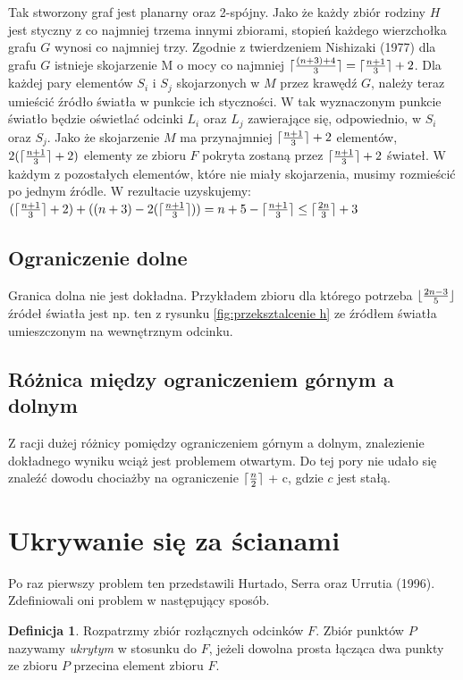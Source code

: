 \documentclass[brudnopis]{xmgr}
\DeclarePairedDelimiter\ceil{\lceil}{\rceil}
\DeclarePairedDelimiter\floor{\lfloor}{\rfloor}
\theoremstyle{definition}
\newtheorem{Definicja}{Definicja}
\begin{document}
Tak stworzony graf jest planarny oraz 2-spójny. Jako że każdy zbiór rodziny $H$ jest styczny z co najmniej trzema innymi zbiorami, stopień każdego wierzchołka grafu $G$ wynosi co najmniej trzy. Zgodnie z twierdzeniem Nishizaki (1977) dla grafu $G$ istnieje skojarzenie M o mocy co najmniej $\ceil{\frac{(n+3)+4}{3}} = \ceil{\frac{n+1}{3}}  + 2$. Dla każdej pary elementów $S_i$ i $S_j$ skojarzonych w $M$ przez krawędź $G$, należy teraz umieścić źródło światła w punkcie ich styczności. W tak wyznaczonym punkcie światło będzie oświetlać odcinki $L_i$ oraz $L_j$ zawierające się, odpowiednio, w $S_i$ oraz $S_j$. Jako że skojarzenie $M$ ma przynajmniej $\ceil{\frac{n+1}{3}} + 2$ elementów, $2(\ceil{\frac{n+1}{3}} + 2)$ elementy ze zbioru $F$ pokryta zostaną przez $\ceil{\frac{n+1}{3}} + 2$ świateł. W każdym z pozostałych elementów, które nie miały skojarzenia, musimy rozmieścić po jednym źródle. W rezultacie uzyskujemy:
$(\ceil{\frac{n+1}{3}} + 2) + ((n + 3) - 2(\ceil{\frac{n+1}{3}})) = n + 5 - \ceil{\frac{n+1}{3}} \le \ceil{\frac{2n}{3}} + 3$

\subsection{Ograniczenie dolne}
\indent Granica dolna nie jest dokładna. Przykładem zbioru dla którego potrzeba $\floor{\frac{2n-3}{5}}$ źródeł światła jest np. ten z rysunku \ref{fig:przeksztalcenie h} ze źródłem światła umieszczonym na wewnętrznym odcinku.

\subsection{Różnica między ograniczeniem górnym a dolnym}
Z racji dużej różnicy pomiędzy ograniczeniem górnym a dolnym, znalezienie dokładnego wyniku wciąż jest problemem otwartym. Do tej pory nie udało się znaleźć dowodu chociażby na ograniczenie $\ceil{\frac{n}{2}}$ + c, gdzie $c$ jest stałą.

\section{Ukrywanie się za ścianami}
Po raz pierwszy problem ten przedstawili Hurtado, Serra oraz Urrutia (1996). Zdefiniowali oni problem w następujący sposób.

\begin{Definicja}\label{ukrywanie definicja}
 Rozpatrzmy zbiór rozłącznych odcinków $F$. Zbiór punktów $P$ nazywamy \emph{ukrytym} w stosunku do $F$, jeżeli dowolna prosta łącząca dwa punkty ze zbioru $P$ przecina element zbioru $F$.
\end{Definicja}
\end{document}
